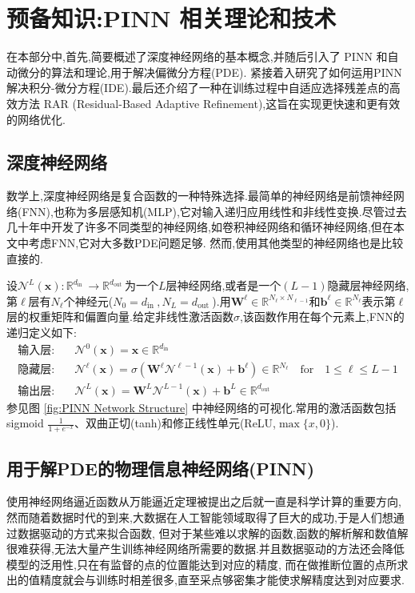 \documentclass{Sichuan Normal University}
\begin{document}
\section{预备知识:PINN 相关理论和技术}
在本部分中,首先,简要概述了深度神经网络的基本概念,并随后引入了 PINN 和自动微分的算法和理论,用于解决偏微分方程(PDE).
紧接着入研究了如何运用PINN解决积分-微分方程(IDE).最后还介绍了一种在训练过程中自适应选择残差点的高效方法 RAR (Residual-Based Adaptive Refinement),这旨在实现更快速和更有效的网络优化.
\subsection{深度神经网络}
数学上,深度神经网络是复合函数的一种特殊选择.最简单的神经网络是前馈神经网络(FNN),也称为多层感知机(MLP),它对输入递归应用线性和非线性变换.尽管过去几十年中开发了许多不同类型的神经网络,如卷积神经网络和循环神经网络,但在本文中考虑FNN,它对大多数PDE问题足够.
然而,使用其他类型的神经网络也是比较直接的.

设$\mathcal{N}^L(\mathbf{x}): \mathbb{R}^{d_{\text {in }}} \rightarrow \mathbb{R}^{d_{\text {out }}}$为一个$L$层神经网络,或者是一个$(L-1)$隐藏层神经网络,第$\ell$层有$N_{\ell}$个神经元($N_0=d_{\text {in }}, N_L=d_{\text {out }}$).用$\boldsymbol{W}^{\ell} \in \mathbb{R}^{N_{\ell} \times N_{\ell-1}}$和$\mathbf{b}^{\ell} \in \mathbb{R}^{N_{\ell}}$表示第$\ell$层的权重矩阵和偏置向量.给定非线性激活函数$\sigma$,该函数作用在每个元素上,FNN的递归定义如下:
\begin{align}
\text{输入层:} & \quad \mathcal{N}^0(\mathbf{x})=\mathbf{x} \in \mathbb{R}^{d_{\text {in }}} \\
\text{隐藏层:} & \quad \mathcal{N}^{\ell}(\mathbf{x})=\sigma\left(\boldsymbol{W}^{\ell} \mathcal{N}^{\ell-1}(\mathbf{x})+\boldsymbol{b}^{\ell}\right) \in \mathbb{R}^{N_{\ell}} \quad \text{for} \quad 1 \leq \ell \leq L-1 \\
\text{输出层:} & \quad \mathcal{N}^L(\mathbf{x})=\boldsymbol{W}^L \mathcal{N}^{L-1}(\mathbf{x})+\boldsymbol{b}^L \in \mathbb{R}^{d_{\text {out }}}
\end{align}
参见图 \ref{fig:PINN Network Structure} 中神经网络的可视化.常用的激活函数包括 sigmoid $\frac{1}{1+e^{-x}}$、双曲正切(tanh)和修正线性单元(ReLU,$\max \{x, 0\}$).

\subsection{用于解PDE的物理信息神经网络(PINN)}
使用神经网络逼近函数从万能逼近定理被提出之后就一直是科学计算的重要方向,然而随着数据时代的到来,大数据在人工智能领域取得了巨大的成功,于是人们想通过数据驱动的方式来拟合函数,
但对于某些难以求解的函数,函数的解析解和数值解很难获得,无法大量产生训练神经网络所需要的数据.并且数据驱动的方法还会降低模型的泛用性,只在有监督的点的位置能达到对应的精度,
而在做推断位置的点所求出的值精度就会与训练时相差很多,直至采点够密集才能使求解精度达到对应要求.
\end{document}
